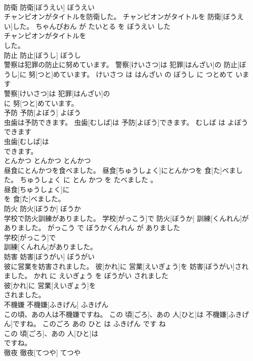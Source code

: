 \documentclass[8pt]{extreport}
\begin{document}
\begin{CJK}{UTF8}{min}
\\	防衛	防衛[ぼうえい]	ぼうえい	
\\	チャンピオンがタイトルを防衛した。	チャンピオンがタイトルを 防衛[ぼうえい]した。	ちゃんぴおん が たいとる を ぼうえい した	
\\	チャンピオンがタイトルを
\\	した。			
\\	防止	防止[ぼうし]	ぼうし	
\\	警察は犯罪の防止に努めています。	警察[けいさつ]は 犯罪[はんざい]の 防止[ぼうし]に 努[つと]めています。	けいさつ は はんざい の ぼうし に つとめて います	
\\	警察[けいさつ]は 犯罪[はんざい]の
\\	に 努[つと]めています。			
\\	予防	予防[よぼう]	よぼう	
\\	虫歯は予防できます。	虫歯[むしば]は 予防[よぼう]できます。	むしば は よぼう できます	
\\	虫歯[むしば]は
\\	できます。			
\\	とんかつ	とんかつ	とんかつ	
\\	昼食にとんかつを食べました。	昼食[ちゅうしょく]にとんかつを 食[た]べました。	ちゅうしょく に とん かつ を たべました 。	
\\	昼食[ちゅうしょく]に
\\	を 食[た]べました。			
\\	防火	防火[ぼうか]	ぼうか	
\\	学校で防火訓練がありました。	学校[がっこう]で 防火[ぼうか] 訓練[くんれん]がありました。	がっこう で ぼうかくんれん が ありました	
\\	学校[がっこう]で
\\	訓練[くんれん]がありました。			
\\	妨害	妨害[ぼうがい]	ぼうがい	
\\	彼に営業を妨害されました。	彼[かれ]に 営業[えいぎょう]を 妨害[ぼうがい]されました。	かれ に えいぎょう を ぼうがい されました	
\\	彼[かれ]に 営業[えいぎょう]を
\\	されました。			
\\	不機嫌	不機嫌[ふきげん]	ふきげん	
\\	この頃、あの人は不機嫌ですね。	この 頃[ごろ]、あの 人[ひと]は 不機嫌[ふきげん]ですね。	このごろ あの ひと は ふきげん です ね	
\\	この 頃[ごろ]、あの 人[ひと]は
\\	ですね。			
\\	徹夜	徹夜[てつや]	てつや	

\end{CJK}
\end{document}
